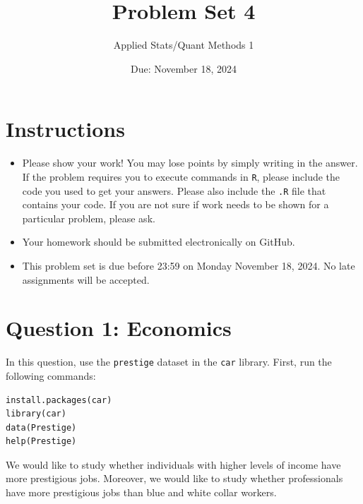 \documentclass[12pt,letterpaper]{article}
\title{Problem Set 4}
\date{Due: November 18, 2024}
\author{Applied Stats/Quant Methods 1}
\begin{document}
	\maketitle
	\section*{Instructions}
	\begin{itemize}
		\item Please show your work! You may lose points by simply writing in the answer. If the problem requires you to execute commands in \texttt{R}, please include the code you used to get your answers. Please also include the \texttt{.R} file that contains your code. If you are not sure if work needs to be shown for a particular problem, please ask.
		\item Your homework should be submitted electronically on GitHub.
		\item This problem set is due before 23:59 on Monday November 18, 2024. No late assignments will be accepted.
	\end{itemize}



	\vspace{.5cm}
\section*{Question 1: Economics}
\vspace{.25cm}
\noindent 	
In this question, use the \texttt{prestige} dataset in the \texttt{car} library. First, run the following commands:

\begin{verbatim}
install.packages(car)
library(car)
data(Prestige)
help(Prestige)
\end{verbatim} 


\noindent We would like to study whether individuals with higher levels of income have more prestigious jobs. Moreover, we would like to study whether professionals have more prestigious jobs than blue and white collar workers.
\end{document}
